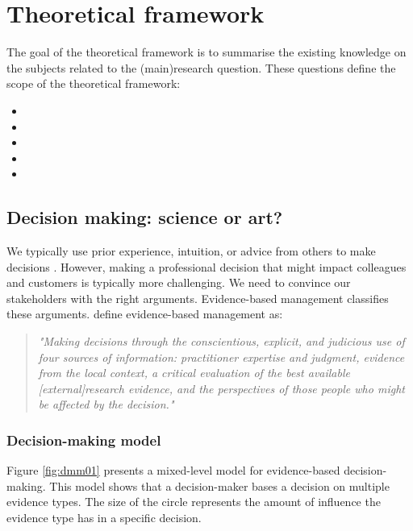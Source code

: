 \section{Theoretical framework} \label{theoreticalframework}
The goal of the theoretical framework is to summarise the existing knowledge on the subjects related to the (main)research question. These questions define the scope of the theoretical framework:
\begin{itemize}[label={}]
\item \tfone
\item \tftwo
\item \tfthree
\item \tffour
\item \tffive
\end{itemize}

\subsection{Decision making: science or art?} \label{tf_ebm}
We typically use prior experience, intuition, or advice from others to make decisions \parencite{DM12}. However, making a professional decision that might impact colleagues and customers is typically more challenging. We need to convince our stakeholders with the right arguments. Evidence-based management classifies these arguments. \cite{DM03} define evidence-based management as:
\begin{quote}\itshape
"Making decisions through the conscientious, explicit, and judicious use of four sources of information: practitioner expertise and judgment, evidence from the local context, a critical evaluation of the best available [external]research evidence, and the perspectives of those people who might be affected by the decision." \parencite{DM03}
\end{quote}

\subsubsection{Decision-making model} \label{tf_dmm}
Figure \ref{fig:dmm01} presents a mixed-level model for evidence-based decision-making. This model shows that a decision-maker bases a decision on multiple evidence types. The size of the circle represents the amount of influence the evidence type has in a specific decision.

